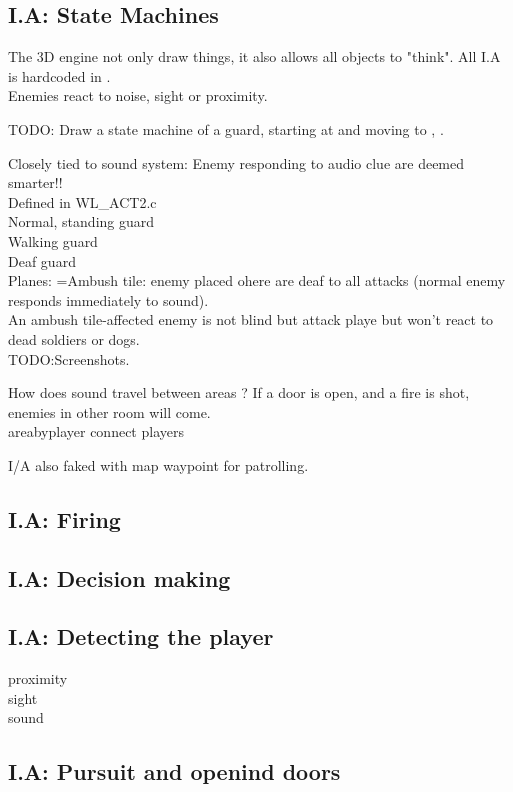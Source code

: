 \subsection{I.A: State Machines}
The 3D engine not only draw things, it also allows all objects to "think". All I.A is hardcoded in .\\ Enemies react to noise, sight or proximity.
\par
TODO: Draw a state machine of a guard, starting at  and moving to , .
\par
Closely tied to sound system: Enemy responding to audio clue are deemed smarter!!\\
Defined in WL\_ACT2.c\\
Normal, standing guard\\
Walking guard\\
Deaf guard\\

Planes:
=Ambush tile: enemy placed ohere are deaf to all attacks (normal enemy responds immediately to sound).\\
An ambush tile-affected enemy is not blind but attack playe but won't react to dead soldiers or dogs.\\
TODO:Screenshots.\\
\par
How does sound travel between areas ? If a door is open, and a fire is shot, enemies in other room will come.\\
areabyplayer connect players\\
\par
I/A also faked with map waypoint for patrolling.\\
\subsection{I.A: Firing}
\subsection{I.A: Decision making}
\subsection{I.A: Detecting the player}
proximity\\
sight\\
sound\\
\subsection{I.A: Pursuit and openind doors}











